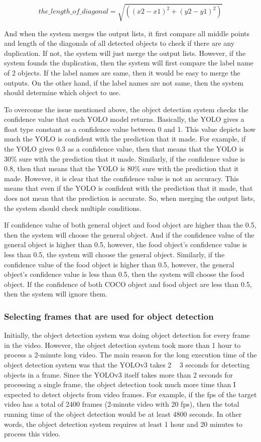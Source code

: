 \documentclass{article}
\begin{document}
\[the\_length\_of\_diagonal = \sqrt{((x2 - x1)^{2} + (y2 - y1)^{2})}\]

And when the system merges the output lists, it first compare all middle points and length of the diagonals of all detected objects to check if there are any duplication. If not, the system will just merge the output lists. However, if the system founds the duplication, then the system will first compare the label name of 2 objects. If the label names are same, then it would be easy to merge the outputs. On the other hand, if the label names are not same, then the system should determine which object to use.

To overcome the issue mentioned above, the object detection system checks the confidence value that each YOLO model returns. Basically, the YOLO gives a float type constant as a confidence value between 0 and 1. This value depicts how much the YOLO is confident with the prediction that it made. For example, if the YOLO gives 0.3 as a confidence value, then that means that the YOLO is 30\% sure with the prediction that it made. Similarly, if the confidence value is 0.8, then that means that the YOLO is 80\% sure with the prediction that it made. However, it is clear that the confidence value is not an accuracy. This means that even if the YOLO is confident with the prediction that it made, that does not mean that the prediction is accurate. So, when merging the output lists, the system should check multiple conditions.

If confidence value of both general object and food object are higher than the 0.5, then the system will choose the general object. And if the confidence value of the general object is higher than 0.5, however, the food object's confidence value is less than 0.5, the system will choose the general object. Similarly, if the confidence value of the food object is higher than 0.5, however, the general object's confidence value is less than 0.5, then the system will choose the food object. If the confidence of both COCO object and food object are less than 0.5, then the system will ignore them.

\subsubsection{Selecting frames that are used for object detection}

Initially, the object detection system was doing object detection for every frame in the video. However, the object detection system took more than 1 hour to process a 2-minute long video. The main reason for the long execution time of the object detection system was that the YOLOv3 takes 2 ~ 3 seconds for detecting objects in a frame. Since the YOLOv3 itself takes more than 2 seconds for processing a single frame, the object detection took much more time than I expected to detect objects from video frames. For example, if the fps of the target video has a total of 2400 frames (2-minute video with 20 fps), then the total running time of the object detection would be at least 4800 seconds. In other words, the object detection system requires at least 1 hour and 20 minutes to process this video.
\end{document}
